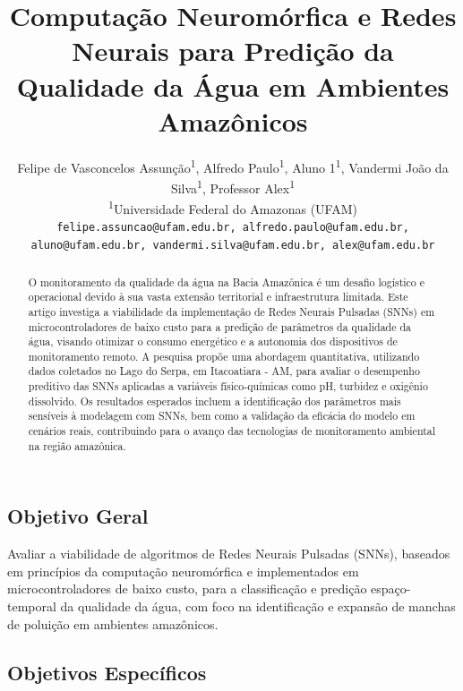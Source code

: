 \documentclass[twoside]{article}
\title{
	Computação Neuromórfica e Redes Neurais para Predição da Qualidade da Água em Ambientes Amazônicos
}
\author{%
	Felipe de Vasconcelos Assunção\textsuperscript{1},
	Alfredo Paulo\textsuperscript{1},
	Aluno 1\textsuperscript{1},
	Vandermi João da Silva\textsuperscript{1},
	Professor Alex\textsuperscript{1}\\[2mm]
	\textsuperscript{1}Universidade Federal do Amazonas (UFAM)\\[1mm]
	\texttt{felipe.assuncao@ufam.edu.br, alfredo.paulo@ufam.edu.br,}\\
	\texttt{aluno@ufam.edu.br, vandermi.silva@ufam.edu.br, alex@ufam.edu.br}%
}
\date{}
\makeatletter
\renewcommand{\maketitle}{%
  \begin{center}
    {\fontsize{24pt}{10pt}\selectfont\bfseries \@title\par}%
    \vspace{1em}
    {\large \@author\par}%
    \vspace{1em}
  \end{center}
}
\makeatother
\begin{document}
\maketitle
\thispagestyle{fancy}


\begin{abstract}
	\noindent
	O monitoramento da qualidade da água na Bacia Amazônica é um desafio logístico e
	operacional devido à sua vasta extensão territorial e infraestrutura limitada.
	Este artigo investiga a viabilidade da implementação de Redes Neurais Pulsadas (SNNs)
	em microcontroladores de baixo custo para a predição de parâmetros da qualidade da água,
	visando otimizar o consumo energético e a autonomia dos dispositivos de monitoramento
	remoto. A pesquisa propõe uma abordagem quantitativa, utilizando dados coletados no Lago 
	do Serpa, em Itacoatiara - AM, para avaliar o desempenho preditivo das SNNs aplicadas a 
	variáveis físico-químicas como pH, turbidez e oxigênio dissolvido. Os resultados esperados
	incluem a identificação dos parâmetros mais sensíveis à modelagem com SNNs, bem como a
	validação da eficácia do modelo em cenários reais, contribuindo para o avanço das
	tecnologias de monitoramento ambiental na região amazônica.
\end{abstract}


\subsection{Objetivo Geral}

Avaliar a viabilidade de algoritmos de Redes Neurais Pulsadas (SNNs), baseados em princípios da 
computação neuromórfica e implementados em microcontroladores de baixo custo, para a classificação e 
predição espaço-temporal da qualidade da água, com foco na identificação e expansão de manchas 
de poluição em ambientes amazônicos.

\subsection{Objetivos Específicos}
\end{document}
